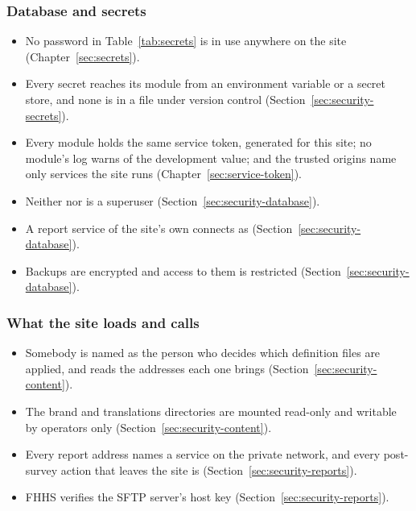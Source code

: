 \documentclass[11pt, a4paper]{article}
\newcommand{\elicitcheck}{\raisebox{-0.12em}{\setlength{\fboxsep}{0pt}\fbox{\rule{0pt}{0.72em}\hspace{0.72em}}}}
\begin{document}
\subsubsection*{Database and secrets}
\begin{itemize}[label = \elicitcheck]
  \item No password in Table~\ref{tab:secrets} is in use anywhere on the site
        (Chapter~\ref{sec:secrets}).
  \item Every secret reaches its module from an environment variable or a secret store, and
        none is in a file under version control (Section~\ref{sec:security-secrets}).
  \item Every module holds the same service token, generated for this site; no module's log
        warns of the development value; and the trusted origins name only services the site
        runs (Chapter~\ref{sec:service-token}).
  \item Neither  nor  is a superuser
        (Section~\ref{sec:security-database}).
  \item A report service of the site's own connects as 
        (Section~\ref{sec:security-database}).
  \item Backups are encrypted and access to them is restricted
        (Section~\ref{sec:security-database}).
\end{itemize}

\subsubsection*{What the site loads and calls}
\begin{itemize}[label = \elicitcheck]
  \item Somebody is named as the person who decides which definition files are applied, and
        reads the addresses each one brings (Section~\ref{sec:security-content}).
  \item The brand and translations directories are mounted read-only and writable by operators
        only (Section~\ref{sec:security-content}).
  \item Every report address names a service on the private network, and every post-survey
        action that leaves the site is  (Section~\ref{sec:security-reports}).
  \item FHHS verifies the SFTP server's host key (Section~\ref{sec:security-reports}).
\end{itemize}
\end{document}
